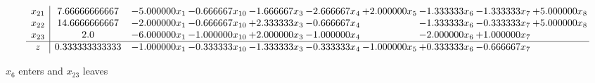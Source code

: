 \documentclass[10pt]{article}
\begin{document}
\[\begin{array}{c| c c@{\hskip 2pt} c@{\hskip 2pt} c@{\hskip 2pt} c@{\hskip 2pt} c@{\hskip 2pt} c@{\hskip 2pt} c@{\hskip 2pt} c@{\hskip 2pt} }
 x_{21}   &  7.66666666667 & -5.000000 x_{1} & -0.666667 x_{10} & -1.666667 x_{3} & -2.666667 x_{4} & + 2.000000 x_{5} & -1.333333 x_{6} & -1.333333 x_{7} & + 5.000000 x_{8}\\
 x_{22}   &  14.6666666667 & -2.000000 x_{1} & -0.666667 x_{10} & + 2.333333 x_{3} & -0.666667 x_{4} &   & -1.333333 x_{6} & -0.333333 x_{7} & + 5.000000 x_{8}\\
 x_{23}   &  2.0 & -6.000000 x_{1} & -1.000000 x_{10} & + 2.000000 x_{3} & -1.000000 x_{4} &   & -2.000000 x_{6} & + 1.000000 x_{7} &   \\
\hline
z    &  0.333333333333 & -1.000000 x_{1} & -0.333333 x_{10} & -1.333333 x_{3} & -0.333333 x_{4} & -1.000000 x_{5} & + 0.333333 x_{6} & -0.666667 x_{7} &   \\
\end{array}\]


 $ x_{6} $ enters and $ x_{23} $ leaves 
\end{document}
